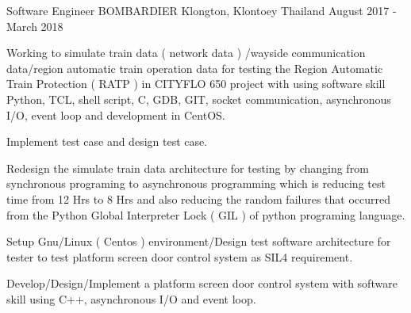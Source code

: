 \begin{cventries}
  \cventry
    {Software Engineer} %
    {BOMBARDIER} %
    {Klongton, Klontoey Thailand} %
    {August 2017 - March 2018} %
    {
      \begin{cvitems} %
       \item {Working to simulate train data ( network data ) /wayside communication
       data/region automatic train operation data for testing the Region Automatic
               Train Protection ( RATP ) in CITYFLO 650 project with using software
               skill Python, TCL, shell script, C, GDB, GIT, socket communication,
               asynchronous I/O, event loop and development in CentOS.}
       \item {Implement test case and design test case.}
       \item {Redesign the simulate train data architecture for testing by changing
       from synchronous programing to asynchronous programming which is reducing test
               time from 12 Hrs to 8 Hrs and also reducing the random failures that
               occurred from the Python Global Interpreter Lock ( GIL ) of python
               programing language.}
       \item {Setup Gnu/Linux ( Centos ) environment/Design test software architecture
       for tester to test platform
               screen door control system as SIL4 requirement.}
       \item {Develop/Design/Implement a platform screen door control system with
  software skill using C++, asynchronous I/O and event loop.}
      \end{cvitems}
    }


\end{cventries}
